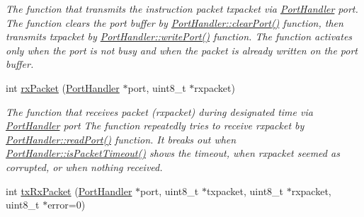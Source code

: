 \begin{DoxyCompactItemize}
\begin{DoxyCompactList}\small\item\em The function that transmits the instruction packet txpacket via \hyperlink{classmercury_1_1_port_handler}{Port\+Handler} port.  The function clears the port buffer by \hyperlink{classmercury_1_1_port_handler_accf37c8838c1ce3042a0127ceeb89c48}{Port\+Handler\+::clear\+Port()} function,  then transmits txpacket by \hyperlink{classmercury_1_1_port_handler_ad26c3a106d6b668b6fae3d2f0afeab9e}{Port\+Handler\+::write\+Port()} function.  The function activates only when the port is not busy and when the packet is already written on the port buffer. \end{DoxyCompactList}\item 
int \hyperlink{classmercury_1_1_protocol1_packet_handler_aa6aad6db73d6f00b45c3c71aa8800b21}{rx\+Packet} (\hyperlink{classmercury_1_1_port_handler}{Port\+Handler} $\ast$port, uint8\+\_\+t $\ast$rxpacket)
\begin{DoxyCompactList}\small\item\em The function that receives packet (rxpacket) during designated time via \hyperlink{classmercury_1_1_port_handler}{Port\+Handler} port  The function repeatedly tries to receive rxpacket by \hyperlink{classmercury_1_1_port_handler_afa6f52d7b95c5ffd8f0c92477d517c79}{Port\+Handler\+::read\+Port()} function.  It breaks out  when \hyperlink{classmercury_1_1_port_handler_a6733438255ede3d34738842e10cd8fc2}{Port\+Handler\+::is\+Packet\+Timeout()} shows the timeout,  when rxpacket seemed as corrupted, or  when nothing received. \end{DoxyCompactList}\item 
int \hyperlink{classmercury_1_1_protocol1_packet_handler_ae488c4554064d6dd0ccabb9d2410e8f0}{tx\+Rx\+Packet} (\hyperlink{classmercury_1_1_port_handler}{Port\+Handler} $\ast$port, uint8\+\_\+t $\ast$txpacket, uint8\+\_\+t $\ast$rxpacket, uint8\+\_\+t $\ast$error=0)

\end{DoxyCompactItemize}
